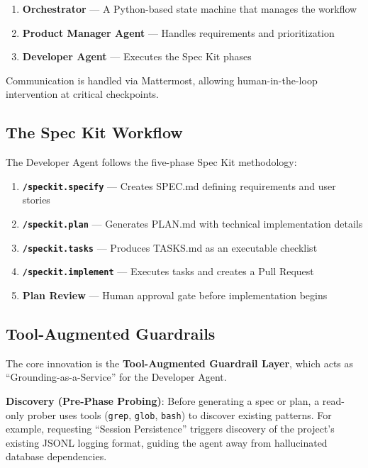 \documentclass[sigconf,anonymous,review]{acmart}
\begin{document}
\begin{enumerate}
  \item \textbf{Orchestrator} --- A Python-based state machine that manages the workflow
  \item \textbf{Product Manager Agent} --- Handles requirements and prioritization
  \item \textbf{Developer Agent} --- Executes the Spec Kit phases
\end{enumerate}

Communication is handled via Mattermost, allowing human-in-the-loop intervention at critical checkpoints.

\subsection{The Spec Kit Workflow}

The Developer Agent follows the five-phase Spec Kit methodology:

\begin{enumerate}
  \item \textbf{\texttt{/speckit.specify}} --- Creates SPEC.md defining requirements and user stories
  \item \textbf{\texttt{/speckit.plan}} --- Generates PLAN.md with technical implementation details
  \item \textbf{\texttt{/speckit.tasks}} --- Produces TASKS.md as an executable checklist
  \item \textbf{\texttt{/speckit.implement}} --- Executes tasks and creates a Pull Request
  \item \textbf{Plan Review} --- Human approval gate before implementation begins
\end{enumerate}

\subsection{Tool-Augmented Guardrails}

The core innovation is the \textbf{Tool-Augmented Guardrail Layer}, which acts as ``Grounding-as-a-Service'' for the Developer Agent.

\textbf{Discovery (Pre-Phase Probing)}: Before generating a spec or plan, a read-only prober uses tools (\texttt{grep}, \texttt{glob}, \texttt{bash}) to discover existing patterns. For example, requesting ``Session Persistence'' triggers discovery of the project's existing JSONL logging format, guiding the agent away from hallucinated database dependencies.
\end{document}
